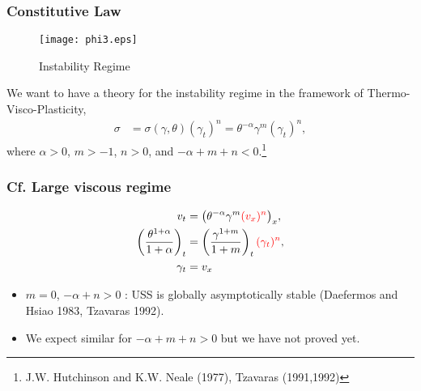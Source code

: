 \documentclass{beamer}
\def\red{\color{red}}
\def\blue{\color{blue}}
\begin{document}
\begin{frame}
 \frametitle{Constitutive Law}
 \begin{figure}
    \centering
    \center
    \texttt{[image: phi3.eps]} 
     \caption{Instability Regime}
    \end{figure} 
 We want to have a theory for the instability regime in the framework of Thermo-Visco-Plasticity,
 \begin{align}
  \sigma &= \sigma(\gamma,\theta)(\gamma_t)^n=\theta^{-\alpha}\gamma^m(\gamma_t)^n, 
 \end{align}%
 where $\alpha>0$, $m>-1$, $n>0$, and {\red $-\alpha +m+n<0$}.\footnote[frame]{J.W. Hutchinson and K.W. Neale (1977), Tzavaras (1991,1992)}
\end{frame}


% 
% 
% 
% 
% 

\begin{frame}
 \frametitle{Cf. Large viscous regime}
 \begin{align*}
  v_t &= \big(\theta^{-\alpha}\gamma^m {\red (v_x)^n}\big)_x,\\
  \left(\frac{\theta^{1+\alpha}}{1+\alpha}\right)_t &= \left(\frac{\gamma^{1+m}}{1+m}\right)_t{\red (\gamma_t)^n},\\
  \gamma_t&=v_x
 \end{align*}
 \begin{itemize}
  \item $m=0$, $-\alpha+n>0$ :  USS is globally asymptotically stable {\footnotesize (Daefermos and Hsiao 1983, Tzavaras 1992)}.
  \item {\blue We expect similar for $-\alpha+m+n>0$ but we have not proved yet.}
 \end{itemize}

  
  \vfill
\end{frame}
\end{document}
